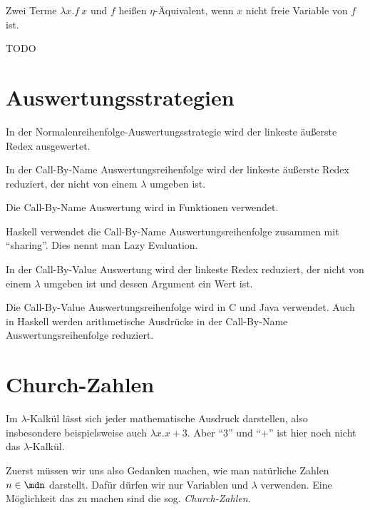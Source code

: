\begin{definition}
    Zwei Terme $\lambda x. f~x$ und $f$ heißen $\eta$-Äquivalent, wenn
    $x$ nicht freie Variable von $f$ ist.
\end{definition}

\begin{beispiel}
    TODO
\end{beispiel}

\section{Auswertungsstrategien}
\begin{definition}[Normalenreihenfolge]%
    In der Normalenreihenfolge-Auswertungsstrategie wird der linkeste äußerste
    Redex ausgewertet.
\end{definition}

\begin{definition}%
    In der Call-By-Name Auswertungsreihenfolge wird der linkeste äußerste Redex
    reduziert, der nicht von einem $\lambda$ umgeben ist.
\end{definition}

Die Call-By-Name Auswertung wird in Funktionen verwendet.

Haskell verwendet die Call-By-Name Auswertungsreihenfolge zusammen mit \enquote{sharing}. Dies nennt man Lazy Evaluation.

\begin{definition}%
    In der Call-By-Value Auswertung wird der linkeste Redex reduziert, der
    nicht von einem $\lambda$ umgeben ist und dessen Argument ein Wert ist.
\end{definition}

Die Call-By-Value Auswertungsreihenfolge wird in C und Java verwendet.
Auch in Haskell werden arithmetische Ausdrücke in der Call-By-Name Auswertungsreihenfolge reduziert.

\section{Church-Zahlen}
Im $\lambda$-Kalkül lässt sich jeder mathematische Ausdruck darstellen, also 
insbesondere beispielsweise auch $\lambda x. x+3$. Aber \enquote{$3$} und
\enquote{$+$} ist hier noch nicht das $\lambda$-Kalkül.

Zuerst müssen wir uns also Gedanken machen, wie man natürliche Zahlen $n \in \mdn$
darstellt. Dafür dürfen wir nur Variablen und $\lambda$ verwenden. Eine Möglichkeit
das zu machen sind die sog. \textit{Church-Zahlen}.

